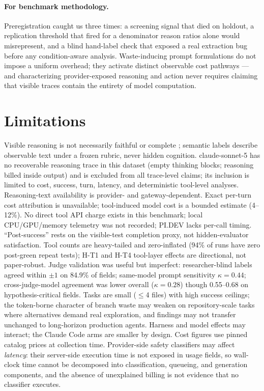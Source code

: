 \documentclass[11pt]{article}
\newcommand{\pidev}{PI.DEV}
\newcommand{\citep}[1]{\cite{#1}}
\newcommand{\cc}{Claude Code}
\begin{document}
\paragraph{For benchmark methodology.} Preregistration caught us three
times: a screening signal that died on holdout, a replication threshold
that fired for a denominator reason ratios alone would misrepresent, and
a blind hand-label check that exposed a real extraction bug before any
condition-aware analysis. Waste-inducing prompt formulations do not
impose a uniform overhead; they activate distinct observable cost
pathways --- and characterizing provider-exposed reasoning and action
never requires claiming that visible traces contain the entirety of model
computation.

\section{Limitations}

Visible reasoning is not necessarily faithful or complete
\citep{baherwani2026}; semantic labels describe observable text under a
frozen rubric, never hidden cognition. claude-sonnet-5 has no recoverable
reasoning trace in this dataset (empty thinking blocks; reasoning billed
inside output) and is excluded from all trace-level claims; its inclusion
is limited to cost, success, turn, latency, and deterministic tool-level
analyses. Reasoning-text availability is provider- and gateway-dependent.
Exact per-turn cost attribution is unavailable; tool-induced model cost
is a bounded estimate (4--12\%). No direct tool API charge exists in this
benchmark; local CPU/GPU/memory telemetry was not recorded; \pidev{}
lacks per-call timing. ``Post-success'' rests on the visible-test
completion proxy, not hidden-evaluator satisfaction. Tool counts are
heavy-tailed and zero-inflated (94\% of runs have zero post-green repeat
tests); H-T1 and H-T4 tool-layer effects are directional, not
paper-robust. Judge validation was useful but imperfect:
researcher-blind labels agreed within $\pm1$ on 84.9\% of fields;
same-model prompt sensitivity $\kappa=0.44$; cross-judge-model agreement
was lower overall ($\kappa=0.28$) though 0.55--0.68 on
hypothesis-critical fields. Tasks are small ($\leq$4 files) with high
success ceilings; the token-borne character of branch waste may weaken on
repository-scale tasks where alternatives demand real exploration, and
findings may not transfer unchanged to long-horizon production agents.
Harness and model effects may interact; the \cc{} arms are smaller by
design. Cost figures use pinned catalog prices at collection time.
Provider-side safety classifiers may affect \emph{latency}: their
server-side execution time is not exposed in usage fields, so wall-clock
time cannot be decomposed into classification, queueing, and generation
components, and the absence of unexplained billing is not evidence that
no classifier executes.
\end{document}
